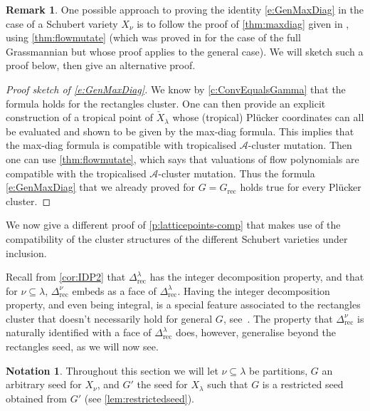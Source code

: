 \documentclass{amsart}
\theoremstyle{definition}
\newtheorem{notation}[thm]{Notation}
\newtheorem{remark}[thm]{Remark}
\numberwithin{equation}{section}
\newcommand{\rect}{\mathrm{rec}}
\begin{document}
\begin{remark}\label{r:MaxDiagMutationProof}
One possible approach to proving the identity  \eqref{e:GenMaxDiag} 
in the case of a Schubert variety $X_\nu$  is to follow the proof of \cref{thm:maxdiag}
given in \cite{RW}, using \cref{thm:flowmutate} (which was proved
in \cite{RW} for the case of the full Grassmannian but whose proof
applies to the general case). We will sketch such a proof below, then give
an alternative proof.
\end{remark}

\begin{proof}[Proof sketch of 
	\cref{e:GenMaxDiag}]
We know by \cref{c:ConvEqualsGamma} that 
the formula holds for  the rectangles cluster.  
One can 
then provide an explicit construction of a tropical point of $\check X_\lambda$ whose (tropical) Pl\"ucker coordinates can all be evaluated and shown to be given by the max-diag formula. This implies that the  max-diag formula is compatible with  tropicalised $\mathcal A$-cluster mutation.  	
Then one can use \cref{thm:flowmutate}, which says that valuations of flow polynomials are compatible with the tropicalised $\mathcal A$-cluster mutation.
Thus the formula \eqref{e:GenMaxDiag} that we already proved for $G=G_{\rect}$ holds true for every Pl\"ucker cluster.
\end{proof}
	
	
We now give a different proof of \cref{p:latticepoints-comp} 
that makes use of the 
compatibility of the cluster structures of the different Schubert varieties under inclusion.  




Recall from \cref{cor:IDP2} that $\Delta_{\rect}^{\lambda}$ has the integer decomposition property, and 
that for $\nu \subseteq \lambda$, $\Delta_{\rect}^{\nu}$ embeds as a face of $\Delta_{\rect}^{\lambda}$.
Having the integer decomposition property, and even being integral, is a special feature associated to the rectangles cluster that doesn't necessarily hold for general $G$, see~\cite[Section~9]{RW}. The property that $\Delta^\nu_{\rect}$ is naturally identified with a face of $\Delta^\lambda_{\rect}$ does, however, generalise beyond the rectangles seed, as we will now see. 


\begin{notation} \label{def:extend}
Throughout this section we will let $\nu \subseteq \lambda$ be 
partitions, $G$  an arbitrary seed for $X_{\nu}$, and $G'$  the seed 
for $X_{\lambda}$ such that $G$ is a restricted seed obtained from $G'$ (see
\cref{lem:restrictedseed}).
\end{notation}
\end{document}

